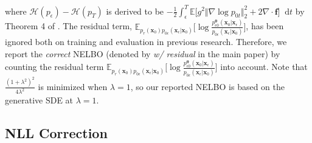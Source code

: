 \documentclass{article}
\theoremstyle{definition}
\theoremstyle{remark}
\newcommand*\diff{\mathop{}\!\mathrm{d}}
\begin{document}
	where $\mathcal{H}(p_{\epsilon})-\mathcal{H}(p_{T})$ is derived to be $-\frac{1}{2}\int_{\epsilon}^{T}\mathbb{E}\big[g^{2}\Vert\nabla\log{p_{0t}}\Vert_{2}^{2}+2\nabla\cdot \mathbf{f}\big]\diff t$ by Theorem 4 of \citet{song2021maximum}. The residual term, $\mathbb{E}_{p_{r}(\mathbf{x}_{0})p_{0\epsilon}(\mathbf{x}_{\epsilon}\vert\mathbf{x}_{0})}\big[\log{\frac{p_{\epsilon 0}^{\bm{\theta}}(\mathbf{x}_{0}\vert\mathbf{x}_{\epsilon})}{p_{0\epsilon}(\mathbf{x}_{\epsilon}\vert\mathbf{x}_{0})}}\big]$, has been ignored both on training and evaluation in previous research. Therefore, we report the \textit{correct} NELBO (denoted by \textit{w/ residual} in the main paper) by counting the residual term $\mathbb{E}_{p_{r}(\mathbf{x}_{0})p_{0\epsilon}(\mathbf{x}_{\epsilon}\vert\mathbf{x}_{0})}\big[\log{\frac{p_{\epsilon 0}^{\bm{\theta}}(\mathbf{x}_{0}\vert\mathbf{x}_{\epsilon})}{p_{0\epsilon}(\mathbf{x}_{\epsilon}\vert\mathbf{x}_{0})}}\big]$ into account. Note that $\frac{(1+\lambda^{2})^{2}}{4\lambda^{2}}$ is minimized when $\lambda=1$, so our reported NELBO is based on the generative SDE at $\lambda=1$.
	
	\subsection{NLL Correction}\label{appendix:nll_correction}
	
\end{document}
